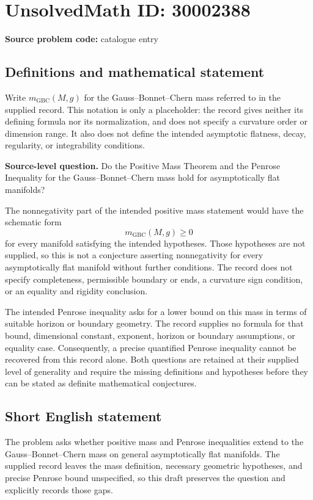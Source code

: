 \documentclass[11pt]{article}
\begin{document}
\section*{UnsolvedMath ID: 30002388}
\textbf{Source problem code:} catalogue entry
\subsection{Definitions and mathematical statement}
Write \(m_{\mathrm{GBC}}(M,g)\) for the Gauss--Bonnet--Chern mass referred to in the supplied record. This notation is only a placeholder: the record gives neither its defining formula nor its normalization, and does not specify a curvature order or dimension range. It also does not define the intended asymptotic flatness, decay, regularity, or integrability conditions.

\textbf{Source-level question.} Do the Positive Mass Theorem and the Penrose Inequality for the Gauss--Bonnet--Chern mass hold for asymptotically flat manifolds?

The nonnegativity part of the intended positive mass statement would have the schematic form
\[
 m_{\mathrm{GBC}}(M,g)\geq 0
\]
for every manifold satisfying the intended hypotheses. Those hypotheses are not supplied, so this is not a conjecture asserting nonnegativity for every asymptotically flat manifold without further conditions. The record does not specify completeness, permissible boundary or ends, a curvature sign condition, or an equality and rigidity conclusion.

The intended Penrose inequality asks for a lower bound on this mass in terms of suitable horizon or boundary geometry. The record supplies no formula for that bound, dimensional constant, exponent, horizon or boundary assumptions, or equality case. Consequently, a precise quantified Penrose inequality cannot be recovered from this record alone. Both questions are retained at their supplied level of generality and require the missing definitions and hypotheses before they can be stated as definite mathematical conjectures.
\subsection{Short English statement}
The problem asks whether positive mass and Penrose inequalities extend to the Gauss--Bonnet--Chern mass on general asymptotically flat manifolds. The supplied record leaves the mass definition, necessary geometric hypotheses, and precise Penrose bound unspecified, so this draft preserves the question and explicitly records those gaps.
\end{document}

